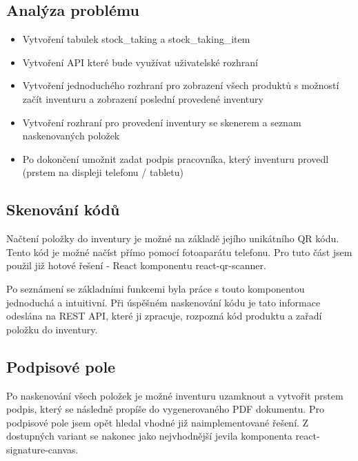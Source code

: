 \subsection{Analýza problému}

\begin{itemize}
    \item Vytvoření tabulek stock\_taking a stock\_taking\_item
    \item Vytvoření API které bude využívat uživatelské rozhraní
    \item Vytvoření jednoduchého rozhraní pro zobrazení všech produktů s možností začít inventuru a zobrazení poslední provedené inventury
    \item Vytvoření rozhraní pro provedení inventury se skenerem a seznam naskenovaných položek
    \item Po dokončení umožnit zadat podpis pracovníka, který inventuru provedl (prstem na displeji telefonu / tabletu)
\end{itemize}

\subsection{Skenování kódů}

Načtení položky do inventury je možné na základě jejího unikátního QR kódu. Tento kód je možné načíst přímo pomocí fotoaparátu telefonu. Pro tuto část jsem použil již hotové řešení - React komponentu react-qr-scanner. 

Po seznámení se základními funkcemi byla práce s touto komponentou jednoduchá a intuitivní. Při úspěšném naskenování kódu je tato informace odeslána na REST API, které ji zpracuje, rozpozná kód produktu a zařadí položku do inventury. 

\subsection{Podpisové pole}

Po naskenování všech položek je možné inventuru uzamknout a vytvořit prstem podpis, který se následně propíše do vygenerovaného PDF dokumentu. Pro podpisové pole jsem opět hledal vhodné již naimplementované řešení. Z dostupných variant se nakonec jako nejvhodnější jevila komponenta react-signature-canvas. 

